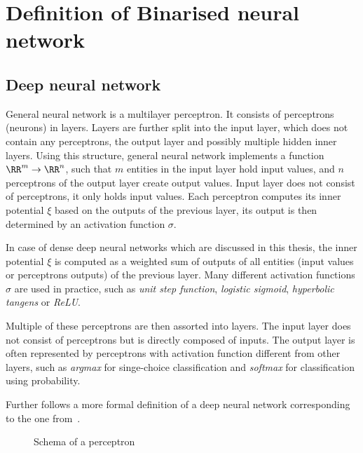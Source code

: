 \section{Definition of Binarised neural network}

\subsection{Deep neural network}

General neural network is a multilayer perceptron. It consists of perceptrons (neurons) in layers.
Layers are further split into the input layer, which does not contain any perceptrons,
the output layer and possibly multiple hidden inner layers.
Using this structure, general neural network implements a function $\RR^m\to\RR^n$,
such that $m$ entities in the input layer hold input values,
and $n$ perceptrons of the output layer create output values.
Input layer does not consist of perceptrons, it only holds input values.
Each perceptron computes its inner potential $\xi$ based on the outputs of
the previous layer, its output is then determined by an activation function $\sigma$.

In case of dense deep neural networks which are discussed in this thesis,
the inner potential $\xi$ is computed as a weighted sum of outputs of all entities
(input values or perceptrons outputs) of the previous layer.
Many different activation functions $\sigma$ are used in practice, such as
\textit{unit step function}, \textit{logistic sigmoid},
\textit{hyperbolic tangens} or \textit{ReLU}.

Multiple of these perceptrons are then assorted into layers. The input layer does not
consist of perceptrons but is directly composed of inputs. The output layer is
often represented by perceptrons with activation function different from other layers, such as
\textit{argmax} for singe-choice classification and
\textit{softmax} for classification using probability.

Further follows a more formal definition of a deep neural network
corresponding to the one from~\cite{Bishop1995NeuralNF}.

\sectionsep{}

\begin{figure}[h]
    \begin{center}
        \caption{Schema of a perceptron}\label{fig:perceptron_schema}
    \end{center}
\end{figure}

